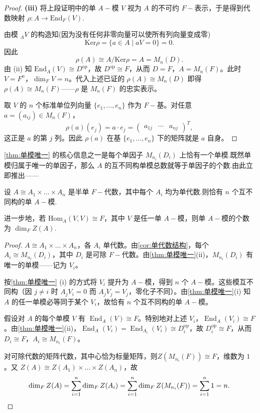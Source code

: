 \begin{proof}
\noindent \textbf{(iii)} 将上段证明中的单 $A-\!\!$模 $V$ 视为 $A$ 的不可约 $F-\!\!$表示，于是得到代数映射 $\rho : A \to \mathrm{End}_F(V)$.\par
\noindent{} 由模 ${}_A V$ 的构造知(因为没有任何非零向量可以使所有列向量变成零)
$$
\mathrm{Ker}\rho = \{ a \in A \mid aV = 0 \} = 0.
$$
因此
$$
\rho(A) \cong A/\mathrm{Ker}\rho = A = M_n(D).
$$
\noindent{} 由 (ii) 知 $\mathrm{End}_A(V) \cong D^{\mathrm{op}}$，故 $D^{\mathrm{op}} \cong F$，从而 $D = F$，$A = M_n(F)$。此时 $V = F^n$，$\dim_F V = n$。代入上述已证的 $\rho(A) \cong M_n(D)$ 即得 $\rho(A) \cong M_n(F)$——$\rho$ 是 $M_n(F)$ 的忠实表示。

取 $V$ 的 $n$ 个标准单位列向量 $\{e_1,\dots,e_n\}$ 作为 $F-\!\!$基。对任意 $a = (a_{ij}) \in M_n(F)$，
\[
\rho(a)(e_j) = a \cdot e_j = \begin{pmatrix} a_{1j} & \cdots & a_{nj} \end{pmatrix}^T,
\]
这正是 $a$ 的第 $j$ 列。因此 $\rho(a)$ 在基 $\{e_1,\dots,e_n\}$ 下的矩阵就是 $a$ 自身。
\end{proof}

\cref{thm:单模唯一} 的核心信息之一是每个单因子 $M_{n_i}(D_i)$ 上恰有一个单模.既然单模归属于唯一的单因子，那么 $A$ 的互不同构单模总数就等于单因子的个数.由此立即推出——

\begin{corollary}
设 $A \cong A_1 \times \dots \times A_n$ 是半单 $F-\!\!$代数，其中每个 $A_i$ 均为单代数.则恰有 $n$ 个互不同构的单 $A-\!\!$模.\par
进一步地，若 $\mathrm{Hom}_A(V, V) \cong F$，其中 $V$ 是任一单 $A-\!\!$模，则单 $A-\!\!$模的个数为 $\dim_F Z(A)$.
\end{corollary}
\begin{proof}
\noindent{} $A \cong A_1 \times \dots \times A_n$，各 $A_i$ 单代数。由\cref{cor:单代数结构}，每个 $A_i \cong M_{n_i}(D_i)$，其中 $D_i$ 是可除 $F-\!\!$代数。由\cref{thm:单模唯一}(ii)，$M_{n_i}(D_i)$ 有唯一的单模——记为 $V_i$。

按\cref{thm:单模唯一} (i) 的方式将 $V_i$ 提升为 $A-\!\!$模，得到 $n$ 个 $A-\!\!$模。这些模互不同构（因 $j \neq i$ 时 $A_j V_i = 0$ 而 $A_j V_j = V_j$，零化子不同）。由\cref{thm:单模唯一}(i) 知 $A$ 的任一单模必等同于某个 $V_i$，故恰有 $n$ 个互不同构的单 $A-\!\!$模。


\noindent{} 假设对 $A$ 的每个单模 $V$ 有 $\operatorname{End}_A(V) \cong F$。特别地对上述 $V_i$，$\operatorname{End}_A(V_i) \cong F$。由\cref{thm:单模唯一}(ii)，$\operatorname{End}_A(V_i) = \operatorname{End}_{A_i}(V_i) \cong D_i^{\mathrm{op}}$，故 $D_i^{\mathrm{op}} \cong F$，从而 $D_i \cong F$，$A_i \cong M_{n_i}(F)$。

对可除代数的矩阵代数，其中心恰为标量矩阵，则$Z(M_{n_i}(F)) \cong F$，维数为 $1$。又 $Z(A) \cong Z(A_1) \times \dots \times Z(A_n)$，故
\[
\dim_F Z(A) = \sum_{i=1}^n \dim_F Z(A_i) = \sum_{i=1}^n \dim_F Z(M_{n_i}(F)) = \sum_{i=1}^n 1 = n. \qedhere
\]

\end{proof}


